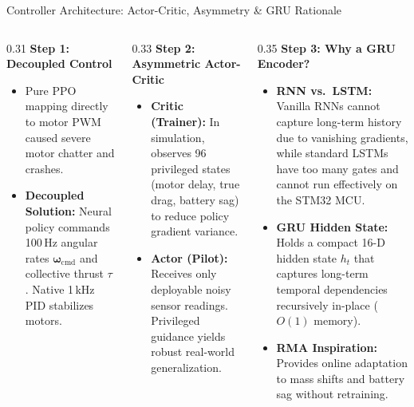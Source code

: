 \documentclass[aspectratio=169,9pt]{beamer}
\begin{document}
\begin{frame}{Controller Architecture: Actor-Critic, Asymmetry \& GRU Rationale}
  \begin{columns}[onlytextwidth,T]
    \begin{column}{0.31\textwidth}
      \textbf{Step 1: Decoupled Control}
      \begin{itemize}\itemsep2pt
        \item Pure PPO mapping directly to motor PWM caused severe motor chatter and crashes.
        \item \textbf{Decoupled Solution:} Neural policy commands 100\,Hz angular rates $\boldsymbol{\omega}_{\text{cmd}}$ and collective thrust $\tau$. Native 1\,kHz PID stabilizes motors.
      \end{itemize}
    \end{column}
    
    \begin{column}{0.33\textwidth}
      \textbf{Step 2: Asymmetric Actor-Critic}
      \begin{itemize}\itemsep2pt
        \item \textbf{Critic (Trainer):} In simulation, observes 96 privileged states (motor delay, true drag, battery sag) to reduce policy gradient variance.
        \item \textbf{Actor (Pilot):} Receives only deployable noisy sensor readings. Privileged guidance yields robust real-world generalization.
      \end{itemize}
    \end{column}
    
    \begin{column}{0.35\textwidth}
      \textbf{Step 3: Why a GRU Encoder?}
      \begin{itemize}\itemsep2pt
        \item \textbf{RNN vs.\ LSTM:} Vanilla RNNs cannot capture long-term history due to vanishing gradients, while standard LSTMs have too many gates and cannot run effectively on the STM32 MCU.
        \item \textbf{GRU Hidden State:} Holds a compact 16-D hidden state $h_t$ that captures long-term temporal dependencies recursively in-place ($O(1)$ memory).
        \item \textbf{RMA Inspiration:} Provides online adaptation to mass shifts and battery sag without retraining.
      \end{itemize}
    \end{column}
  \end{columns}
  

\end{frame}
\end{document}

